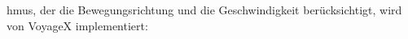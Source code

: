 \begin{itemize}[leftmargin=*,noitemsep,topsep=1ex,parsep=0pt,partopsep=0pt]
hmus, der die Bewegungsrichtung und die Geschwindigkeit berücksichtigt, wird von VoyageX implementiert:
	\begin{itemize}[leftmargin=*,noitemsep,topsep=1ex,parsep=0pt,partopsep=0pt]

\end{itemize}
\end{itemize}
